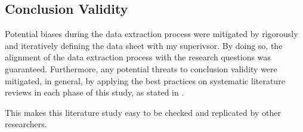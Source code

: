 \subsection{Conclusion Validity}
Potential biases during the data extraction process were mitigated by rigorously and iteratively defining the data sheet with my superivsor.
By doing so, the alignment of the data extraction process with the research questions was guaranteed.
Furthermore, any potential threats to conclusion validity were mitigated, in general, by applying the best practices on systematic
literature reviews in each phase of this study, as stated in 
\cite{petersen2015guidelines_systematic, kitchenham2013systematic_review_guidelines, wohlin2012experimentation}.

This makes this literature study easy to be checked and replicated by other researchers.